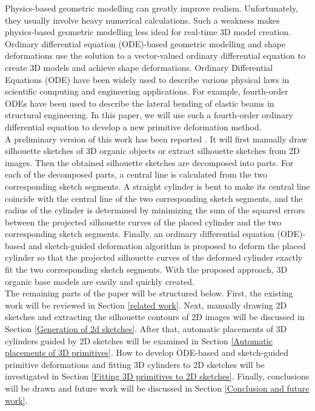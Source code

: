 \documentclass[runningheads]{llncs}
\begin{document}
Physics-based geometric modelling can greatly improve realism. Unfortunately, they usually involve heavy numerical calculations. Such a weakness makes physics-based geometric modelling less ideal for real-time 3D model creation. Ordinary differential equation (ODE)-based geometric modelling and shape deformations use the solution to a vector-valued ordinary differential equation to create 3D models and achieve shape deformations. Ordinary Differential Equations (ODE) have been widely used to describe various physical laws in scientific computing and engineering applications. For example, fourth-order ODEs have been used to describe the lateral bending of elastic beams in structural engineering. In this paper, we will use such a fourth-order ordinary differential equation to develop a new primitive deformation method.\\

A preliminary version of this work has been reported \cite{Li2019ODE}. It will first manually draw silhouette sketches of 3D organic objects or extract silhouette sketches from 2D images. Then the obtained silhouette sketches are decomposed into parts. For each of the decomposed parts, a central line is calculated from the two corresponding sketch segments. A straight cylinder is bent to make its central line coincide with the central line of the two corresponding sketch segments, and the radius of the cylinder is determined by minimizing the sum of the squared errors between the projected silhouette curves of the placed cylinder and the two corresponding sketch segments. Finally, an ordinary differential equation (ODE)-based and sketch-guided deformation algorithm is proposed to deform the placed cylinder so that the projected silhouette curves of the deformed cylinder exactly fit the two corresponding sketch segments. With the proposed approach, 3D organic base models are easily and quickly created.\\

The remaining parts of the paper will be structured below. First, the existing work will be reviewed in Section \ref{related work}. Next, manually drawing 2D sketches  and extracting the silhouette contours of 2D images will be discussed in Section \ref{Generation of 2d sketches}. After that, automatic placements of 3D cylinders guided by 2D sketches will be examined in Section \ref{Automatic placements of 3D primitives}. How to develop ODE-based and sketch-guided primitive deformations and fitting 3D cylinders to 2D sketches will be investigated in Section \ref{Fitting 3D primitives to 2D sketches}. Finally, conclusions will be drawn and future work will be discussed in Section \ref{Conclusion and future work}.
\end{document}
